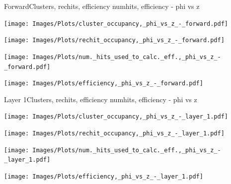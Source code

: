 \documentclass{beamer}
\begin{document}
\begin{frame}{Forward}{Clusters, rechits, efficiency numhits, efficiency - phi vs z}
  \hspace{0.01\textwidth}%
  \begin{minipage}{0.45\textwidth}
    \centering
    \texttt{[image: Images/Plots/cluster\_occupancy,\_phi\_vs\_z\_-\_forward.pdf]}
  \end{minipage}%
  \hspace{0.01\textwidth}%
  \begin{minipage}{0.45\textwidth}
    \centering
    \texttt{[image: Images/Plots/rechit\_occupancy,\_phi\_vs\_z\_-\_forward.pdf]}
  \end{minipage}
  \vspace*{0.2cm}
  \begin{minipage}{0.45\textwidth}
    \centering
    \texttt{[image: Images/Plots/num.\_hits\_used\_to\_calc.\_eff.,\_phi\_vs\_z\_-\_forward.pdf]}
  \end{minipage}%
  \hspace{0.01\textwidth}%
  \begin{minipage}{0.45\textwidth}
    \centering
    \texttt{[image: Images/Plots/efficiency,\_phi\_vs\_z\_-\_forward.pdf]}
  \end{minipage}
\end{frame}

\begin{frame}{Layer 1}{Clusters, rechits, efficiency numhits, efficiency - phi vs z}
  \hspace{0.01\textwidth}%
  \begin{minipage}{0.45\textwidth}
    \centering
    \texttt{[image: Images/Plots/cluster\_occupancy,\_phi\_vs\_z\_-\_layer\_1.pdf]}
  \end{minipage}%
  \hspace{0.01\textwidth}%
  \begin{minipage}{0.45\textwidth}
    \centering
    \texttt{[image: Images/Plots/rechit\_occupancy,\_phi\_vs\_z\_-\_layer\_1.pdf]}
  \end{minipage}
  \vspace*{0.2cm}
  \begin{minipage}{0.45\textwidth}
    \centering
    \texttt{[image: Images/Plots/num.\_hits\_used\_to\_calc.\_eff.,\_phi\_vs\_z\_-\_layer\_1.pdf]}
  \end{minipage}%
  \hspace{0.01\textwidth}%
  \begin{minipage}{0.45\textwidth}
    \centering
    \texttt{[image: Images/Plots/efficiency,\_phi\_vs\_z\_-\_layer\_1.pdf]}
  \end{minipage}
\end{frame}
\end{document}
